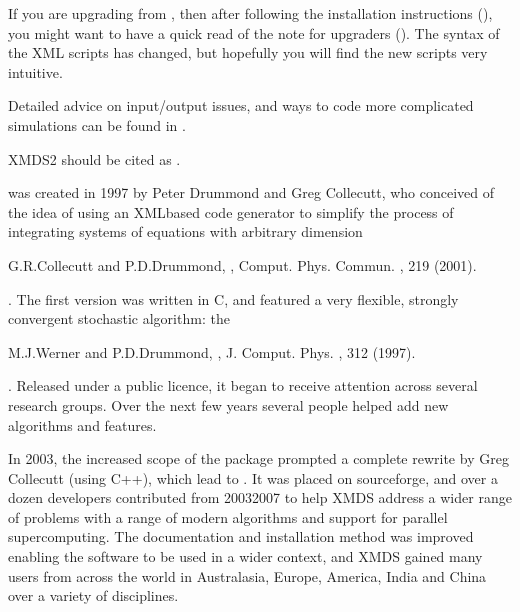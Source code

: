 \documentclass[letterpaper,10pt,english]{sphinxmanual}
\begin{document}
\sphinxAtStartPar
If you are upgrading from , then after following the installation instructions ({\hyperref[\detokenize{installation:installation}]{}}), you might want to have a quick read of the note for upgraders ({\hyperref[\detokenize{upgrade:upgradefromxmds1}]{}}).  The syntax of the XML scripts has changed, but hopefully you will find the new scripts very intuitive.

\sphinxAtStartPar
Detailed advice on input/output issues, and ways to code more complicated simulations can be found in {\hyperref[\detokenize{advanced_topics:advancedtopics}]{}}.

\sphinxAtStartPar
XMDS2 should be cited as .

\label{\detokenize{introduction:xmdshistory}}
\sphinxAtStartPar
{}    was created in 1997 by Peter Drummond and Greg Collecutt, who conceived of the idea of using an XML\sphinxhyphen{}based code generator to simplify the process of integrating systems of equations with arbitrary dimension %
\begin{footnote}[1]\sphinxAtStartFootnote
G.R.Collecutt and P.D.Drummond, , Comput. Phys. Commun. , 219 (2001).
%
\end{footnote}.  The first version was written in C, and featured a very flexible, strongly convergent stochastic algorithm: the {\hyperref[\detokenize{reference_elements:si}]{}} %
\begin{footnote}[2]\sphinxAtStartFootnote
M.J.Werner and P.D.Drummond, , J. Comput. Phys. , 312 (1997).
%
\end{footnote}.  Released under a public licence, it began to receive attention across several research groups.  Over the next few years several people helped add new algorithms and features.

\sphinxAtStartPar
In 2003, the increased scope of the package prompted a complete rewrite by Greg Collecutt (using C++), which lead to .  It was placed on sourceforge, and over a dozen developers contributed from 2003\sphinxhyphen{}2007 to help XMDS address a wider range of problems with a range of modern algorithms and support for parallel supercomputing.  The documentation and installation method was improved enabling the software to be used in a wider context, and XMDS gained many users from across the world \sphinxhyphen{} in Australasia, Europe, America, India and China \sphinxhyphen{} over a variety of disciplines.
\end{document}
